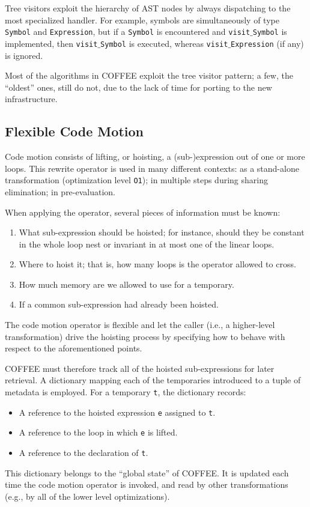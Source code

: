 Tree visitors exploit the hierarchy of AST nodes by always dispatching to the most specialized handler. For example, symbols are simultaneously of type \texttt{Symbol} and \texttt{Expression}, but if a \texttt{Symbol} is encountered and \texttt{visit$\_$Symbol} is implemented, then \texttt{visit$\_$Symbol} is executed, whereas \texttt{visit$\_$Expression} (if any) is ignored.

Most of the algorithms in COFFEE exploit the tree visitor pattern; a few, the ``oldest'' ones, still do not, due to the lack of time for porting to the new infrastructure.

\subsection{Flexible Code Motion}
\label{sec:coffee:cm}
Code motion consists of lifting, or hoisting, a (sub-)expression out of one or more loops. This rewrite operator is used in many different contexts: as a stand-alone transformation (optimization level \texttt{O1}); in multiple steps during sharing elimination; in pre-evaluation. 

When applying the operator, several pieces of information must be known:
\begin{enumerate}
\item What sub-expression should be hoisted; for instance, should they be constant in the whole loop nest or invariant in at most one of the linear loops.
\item Where to hoist it; that is, how many loops is the operator allowed to cross.
\item How much memory are we allowed to use for a temporary.
\item If a common sub-expression had already been hoisted.
\end{enumerate}
The code motion operator is flexible and let the caller (i.e., a higher-level transformation) drive the hoisting process by specifying how to behave with respect to the aforementioned points.

COFFEE must therefore track all of the hoisted sub-expressions for later retrieval. A dictionary mapping each of the temporaries introduced to a tuple of metadata is employed. For a temporary \texttt{t}, the dictionary records:
\begin{itemize}
\item A reference to the hoisted expression \texttt{e} assigned to \texttt{t}.
\item A reference to the loop in which \texttt{e} is lifted.
\item A reference to the declaration of \texttt{t}.
\end{itemize}
This dictionary belongs to the ``global state'' of COFFEE. It is updated each time the code motion operator is invoked, and read by other transformations (e.g., by all of the lower level optimizations).

